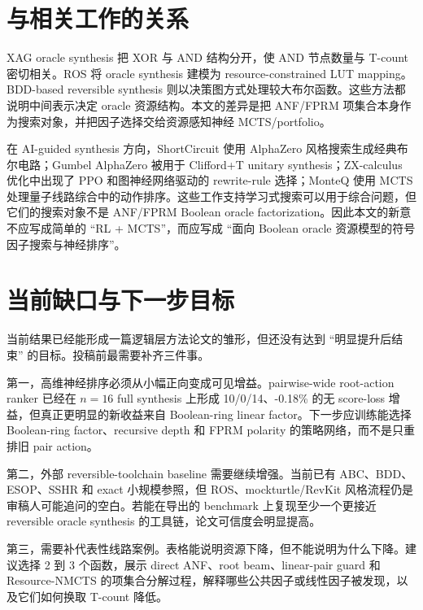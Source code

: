 \documentclass[UTF8,fontset=macnew,11pt]{ctexart}
\newcommand{\method}{Resource-NMCTS}
\begin{document}
\section{与相关工作的关系}

XAG oracle synthesis 把 XOR 与 AND 结构分开，使 AND 节点数量与 T-count 密切相关\cite{meuli2022xag,meuli2019multiplicative}。ROS 将 oracle synthesis 建模为 resource-constrained LUT mapping\cite{meuli2020ros}。BDD-based reversible synthesis 则以决策图方式处理较大布尔函数\cite{wille2009bdd}。这些方法都说明中间表示决定 oracle 资源结构。本文的差异是把 ANF/FPRM 项集合本身作为搜索对象，并把因子选择交给资源感知神经 MCTS/portfolio。

在 AI-guided synthesis 方向，ShortCircuit 使用 AlphaZero 风格搜索生成经典布尔电路\cite{tsaras2024shortcircuit}；Gumbel AlphaZero 被用于 Clifford+T unitary synthesis\cite{rietsch2024unitary}；ZX-calculus 优化中出现了 PPO 和图神经网络驱动的 rewrite-rule 选择\cite{riu2025zx}；MonteQ 使用 MCTS 处理量子线路综合中的动作排序\cite{machiya2026monteq}。这些工作支持学习式搜索可以用于综合问题，但它们的搜索对象不是 ANF/FPRM Boolean oracle factorization。因此本文的新意不应写成简单的 ``RL + MCTS''，而应写成 ``面向 Boolean oracle 资源模型的符号因子搜索与神经排序''。

\section{当前缺口与下一步目标}

当前结果已经能形成一篇逻辑层方法论文的雏形，但还没有达到 ``明显提升后结束'' 的目标。投稿前最需要补齐三件事。

第一，高维神经排序必须从小幅正向变成可见增益。pairwise-wide root-action ranker 已经在 $n=16$ full synthesis 上形成 10/0/14、-0.18\% 的无 score-loss 增益，但真正更明显的新收益来自 Boolean-ring linear factor。下一步应训练能选择 Boolean-ring factor、recursive depth 和 FPRM polarity 的策略网络，而不是只重排旧 pair action。

第二，外部 reversible-toolchain baseline 需要继续增强。当前已有 ABC、BDD、ESOP、SSHR 和 exact 小规模参照，但 ROS、mockturtle/RevKit 风格流程仍是审稿人可能追问的空白。若能在导出的 benchmark 上复现至少一个更接近 reversible oracle synthesis 的工具链，论文可信度会明显提高。

第三，需要补代表性线路案例。表格能说明资源下降，但不能说明为什么下降。建议选择 2 到 3 个函数，展示 direct ANF、root beam、linear-pair guard 和 \method{} 的项集合分解过程，解释哪些公共因子或线性因子被发现，以及它们如何换取 T-count 降低。
\end{document}
